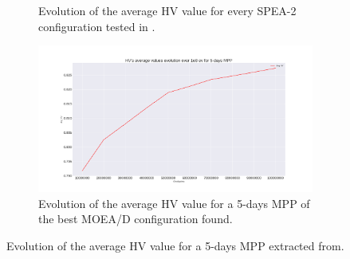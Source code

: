 \begin{figure}[H]
\begin{subfigure}{.5\textwidth}
  \label{fig:sfig2}
  \caption{Evolution of the average HV value for every SPEA-2 configuration tested in \cite{Miranda2018}.}
\end{subfigure}
\centering
\begin{subfigure}{.9\textwidth}
  \centering
  \includegraphics[width=1.0\linewidth]{../experiments/plots/avgHV_evolution_5_days.png}
  \caption{Evolution of the average HV value for a 5-days MPP of the best MOEA/D configuration found.}
\end{subfigure}
\caption{Evolution of the average HV value for a 5-days MPP extracted from\cite{Miranda2018}.}
\label{fig:previous_HV_5}
\end{figure}





